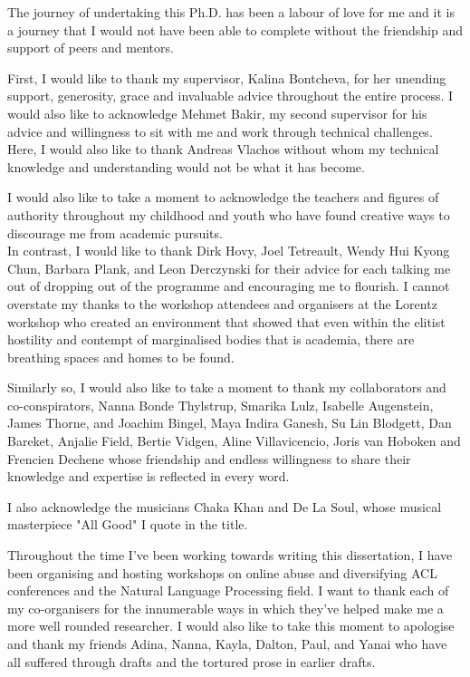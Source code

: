 
\begin{acknowledgements}      

The journey of undertaking this Ph.D. has been a labour of love for me and it is a journey that I would not have been able to complete without the friendship and support of peers and mentors.

First, I would like to thank my supervisor, Kalina Bontcheva, for her unending support, generosity, grace and invaluable advice throughout the entire process.
I would also like to acknowledge Mehmet Bakir, my second supervisor for his advice and willingness to sit with me and work through technical challenges.
Here, I would also like to thank Andreas Vlachos without whom my technical knowledge and understanding would not be what it has become.

I would also like to take a moment to acknowledge the teachers and figures of authority throughout my childhood and youth who have found creative ways to discourage me from academic pursuits.\\
In contrast, I would like to thank Dirk Hovy, Joel Tetreault, Wendy Hui Kyong Chun, Barbara Plank, and Leon Derczynski for their advice for each talking me out of dropping out of the programme and encouraging me to flourish.
I cannot overstate my thanks to the workshop attendees and organisers at the Lorentz workshop who created an environment that showed that even within the elitist hostility and contempt of marginalised bodies that is academia, there are breathing spaces and homes to be found.

Similarly so, I would also like to take a moment to thank my collaborators and co-conspirators, Nanna Bonde Thylstrup, Smarika Lulz, Isabelle Augenstein, James Thorne, and Joachim Bingel, Maya Indira Ganesh, Su Lin Blodgett, Dan Bareket, Anjalie Field, Bertie Vidgen, Aline Villavicencio, Joris van Hoboken and Frencien Dechene whose friendship and endless willingness to share their knowledge and expertise is reflected in every word.

I also acknowledge the musicians Chaka Khan and De La Soul, whose musical masterpiece "All Good" I quote in the title.

Throughout the time I've been working towards writing this dissertation, I have been organising and hosting workshops on online abuse and diversifying ACL conferences and the Natural Language Processing field.
I want to thank each of my co-organisers for the innumerable ways in which they've helped make me a more well rounded researcher.
I would also like to take this moment to apologise and thank my friends Adina, Nanna, Kayla, Dalton, Paul, and Yanai who have all suffered through drafts and the tortured prose in earlier drafts.


\end{acknowledgements}

